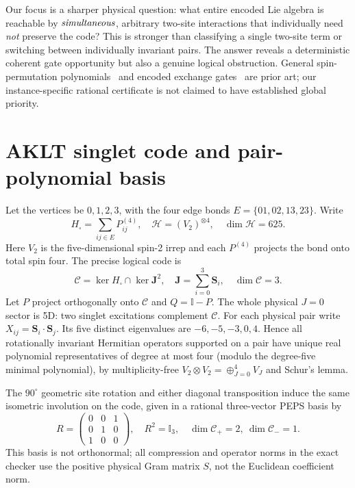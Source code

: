\documentclass[aps,pra,twocolumn,nofootinbib,superscriptaddress,10pt]{revtex4-2}
\newcommand{\Cc}{\mathcal C}\newcommand{\HH}{\mathcal H}\newcommand{\Id}{\mathbb I}
\begin{document}
Our focus is a sharper physical question: what entire encoded Lie algebra is reachable by $\emph{simultaneous}$, arbitrary two-site interactions that individually need \emph{not} preserve the code? This is stronger than classifying a single two-site term or switching between individually invariant pairs. The answer reveals a deterministic coherent gate opportunity but also a genuine logical obstruction. General spin-permutation polynomials~\cite{Swap} and encoded exchange gates~\cite{Exchange} are prior art; our instance-specific rational certificate is not claimed to have established global priority.

\section{AKLT singlet code and pair-polynomial basis}
Let the vertices be $0,1,2,3$, with the four edge bonds $E=\{01,02,13,23\}$. Write
\begin{equation}
H_{\square}=\sum_{ij\in E}P^{(4)}_{ij},\quad \HH=(V_2)^{\otimes4},\quad \dim\HH=625.
\end{equation}
Here $V_2$ is the five-dimensional spin-2 irrep and each $P^{(4)}$ projects the bond onto total spin four. The precise logical code is
\begin{equation}
\Cc=\ker H_\square\cap\ker\bm J^2,\quad \bm J=\sum_{i=0}^3\bm S_i,\quad \dim\Cc=3.
\end{equation}
Let $P$ project orthogonally onto $\Cc$ and $Q=\Id-P$. The whole physical $J=0$ sector is 5D: two singlet excitations complement $\Cc$. For each physical pair write $X_{ij}=\bm S_i\cdot\bm S_j$. Its five distinct eigenvalues are $-6,-5,-3,0,4$. Hence all rotationally invariant Hermitian operators supported on a pair have unique real polynomial representatives of degree at most four (modulo the degree-five minimal polynomial), by multiplicity-free $V_2\otimes V_2=\oplus_{J=0}^4V_J$ and Schur's lemma.

The $90^{\circ}$ geometric site rotation and either diagonal transposition induce the same isometric involution on the code, given in a rational three-vector PEPS basis by
\begin{equation}\label{eq:R}
R=\begin{pmatrix}0&0&1\\0&1&0\\1&0&0\end{pmatrix},\quad R^2=\Id_3,\quad \dim\Cc_{+}=2,\ \dim\Cc_{-}=1.
\end{equation}
This basis is not orthonormal; all compression and operator norms in the exact checker use the positive physical Gram matrix $S$, not the Euclidean coefficient norm.
\end{document}
